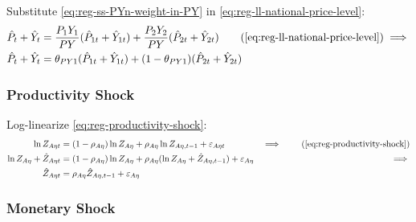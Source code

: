 \documentclass[../thesis.tex]{subfiles}
\begin{document}
Substitute \ref{eq:reg-ss-PYn-weight-in-PY} in \ref{eq:reg-ll-national-price-level}:
\begin{alignat}{2}
	\hat{P}_{t} + \hat{Y}_{t} &= \frac{P_{1} Y_{1}}{P Y} (\hat{P}_{1t} + \hat{Y}_{1t}) + \frac{P_{2} Y_{2}}{P Y} (\hat{P}_{2t} + \hat{Y}_{2t}) \tag{\ref{eq:reg-ll-national-price-level}} \implies \\
	\hat{P}_{t} + \hat{Y}_{t} &= \theta_{PY1} (\hat{P}_{1t} + \hat{Y}_{1t}) + (1-\theta_{PY1}) (\hat{P}_{2t} + \hat{Y}_{2t}) \label{eq:reg-ll-national-price-level-2}
\end{alignat}


\begin{comment}
	
	P_{t} &= \theta_{P1} P_{1t} + (1 -\theta_{P1}) P_{2t} &\implies \tag{\ref{eq:national-price-level}} \\ 
	P (1 +\hat{P}_{t}) &= \theta_{P1} P_{1} (1 +\hat{P}_{1t}) + (1 -\theta_{P1}) P_{2} (1 +\hat{P}_{2t}) &\implies \nonumber \\
	\hat{P}_{t} &= \theta_{P1} \hat{P}_{1t} + (1 -\theta_{P1}) \hat{P}_{2t} %
\end{comment}


\subsubsection*{Productivity Shock}

Log-linearize \ref{eq:reg-productivity-shock}:
\begin{alignat}{2}
	\ln{Z_{A\eta t}} &= (1-\rho_{A\eta})\ln{Z_{A\eta}} + \rho_{A\eta}\ln{Z_{A\eta,t-1}} + \varepsilon_{A\eta t} &\implies \tag{\ref{eq:reg-productivity-shock}} \\
	\ln{Z_{A\eta}} + \hat{Z}_{A\eta t} &= (1-\rho_{A\eta}) \ln{Z_{A\eta}} + \rho_{A\eta} (\ln{Z_{A\eta}} + \hat{Z}_{A\eta, t-1}) + \varepsilon_{A\eta} &\implies \nonumber \\
	\hat{Z}_{A\eta t} &= \rho_{A\eta} \hat{Z}_{A\eta, t-1} + \varepsilon_{A\eta} \label{eq:reg-ll-productivity-shock}
\end{alignat}


\subsubsection*{Monetary Shock}
\end{document}
